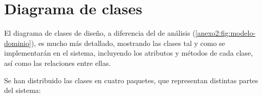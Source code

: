 

\section{Diagrama de clases}
\label{anexo2:sec:diagrama-clases-diseno}
El diagrama de clases de diseño, a diferencia del de análisis (\ref{anexo2:fig:modelo-dominio}), es
mucho más detallado, mostrando las clases tal y como se implementarán en el sistema, incluyendo
los atributos y métodos de cada clase, así como las relaciones entre ellas.

Se han distribuido las clases en cuatro paquetes, que representan distintas partes del sistema:
